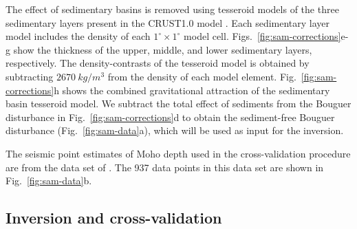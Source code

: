 \documentclass[extra,mreferee]{gji}
\begin{document}
The effect of sedimentary basins is removed using
tesseroid models of the three sedimentary layers present in the CRUST1.0 model
\citep[][ \url{http://igppweb.ucsd.edu/~gabi/rem.html}]{laske2013}.
Each sedimentary layer model includes the density
of each $1^\circ \times 1^\circ$ model cell.
Figs.~\ref{fig:sam-corrections}e-g show the thickness of the upper, middle, and
lower sedimentary layers, respectively.
The density-contrasts of the tesseroid model is obtained by subtracting
$2670\ kg/m^3$ from the density of each model element.
Fig.~\ref{fig:sam-corrections}h shows the combined gravitational attraction of
the sedimentary basin tesseroid model.
We subtract the total effect of sediments from the Bouguer disturbance in
Fig.~\ref{fig:sam-corrections}d to obtain
the sediment-free Bouguer disturbance (Fig.~\ref{fig:sam-data}a),
which will be used as input for the inversion.

The seismic point estimates of Moho depth used in the cross-validation
procedure are from the data set of \citet{assumpcao2013a}.
The 937 data points in this data set are shown in Fig.~\ref{fig:sam-data}b.


\subsection{Inversion and cross-validation}
\end{document}
